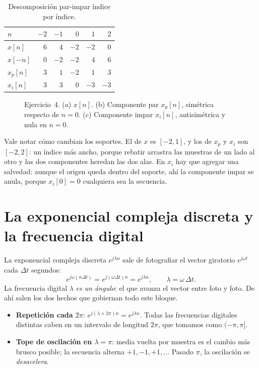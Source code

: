 \documentclass[10pt,a4paper]{article}
\newcommand{\tema}[1]{%
  \bigskip
  \section*{#1}
  \vspace{-0.6em}
}
\begin{document}
	\begin{table}[H]
		\centering
		\caption{Descomposición par-impar índice por índice.}
		\label{tab:sol_ej4}
		\begin{tabular}{lrrrrr}
			\toprule
			$n$      & $-2$ & $-1$ & $0$  & $1$  & $2$ \\
			\midrule
			$x[n]$   & $6$  & $4$  & $-2$ & $-2$ & $0$ \\
			$x[-n]$  & $0$  & $-2$ & $-2$ & $4$  & $6$ \\
			$x_p[n]$ & $3$  & $1$  & $-2$ & $1$  & $3$ \\
			$x_i[n]$ & $3$  & $3$  & $0$  & $-3$ & $-3$ \\
			\bottomrule
		\end{tabular}
	\end{table}

	\begin{figure}[H]
		\centering
		
		\caption{Ejercicio~4. (a) $x[n]$. (b) Componente par $x_p[n]$, simétrica
		respecto de $n=0$. (c) Componente impar $x_i[n]$, antisimétrica y nula en
		$n=0$.}
		\label{fig:sol_ej4}
	\end{figure}

	Vale notar cómo cambian los soportes. El de $x$ es $[-2,1]$, y los de $x_p$ y $x_i$ son
	$[-2,2]$: un índice más ancho, porque rebatir arrastra las muestras de un lado al otro y
	las dos componentes heredan las dos alas. En $x_i$ hay que agregar una salvedad: aunque el
	origen queda dentro del soporte, ahí la componente impar se anula, porque $x_i[0]=0$
	cualquiera sea la secuencia.

	\tema{La exponencial compleja discreta y la frecuencia digital}

	La exponencial compleja discreta $e^{j\lambda n}$ sale de fotografiar el vector
	giratorio $e^{j\omega t}$ cada $\Delta t$ segundos:
	\[
		e^{j\omega(n\Delta t)} = e^{j(\omega\Delta t)n} = e^{j\lambda n},
		\qquad \lambda = \omega\,\Delta t .
	\]
	La frecuencia digital $\lambda$ \emph{es un ángulo}: el que avanza el vector entre foto
	y foto. De ahí salen los dos hechos que gobiernan todo este bloque.

	\begin{itemize}[nosep]
		\item \textbf{Repetición cada $2\pi$}: $e^{j(\lambda+2\pi)n} = e^{j\lambda n}$.
		      Todas las frecuencias digitales distintas caben en un intervalo de longitud
		      $2\pi$, que tomamos como $(-\pi,\pi]$.
		\item \textbf{Tope de oscilación en $\lambda=\pi$}: media vuelta por muestra es el
		      cambio más brusco posible; la secuencia alterna $+1,-1,+1,\dots$ Pasado
		      $\pi$, la oscilación se \emph{desacelera}.
	\end{itemize}
\end{document}
